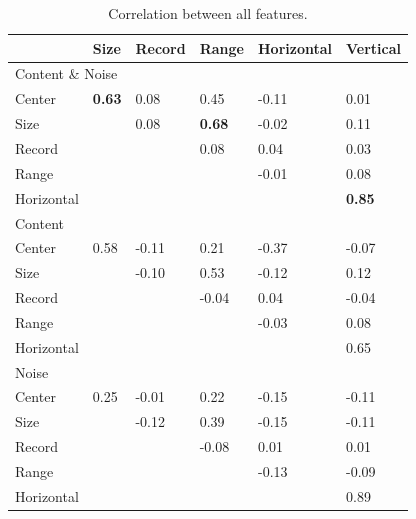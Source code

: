 \begin{table}[h]
\centering
\caption{Correlation between all features.}
\label{tab:featcorr}
\begin{tabular}{ | l | l | l | l | l | l |}
\hline
& Size & Record & Range & Horizontal & Vertical \\ \hline
\multicolumn{6}{|l|}{Content \& Noise} \\
\hline
Center & \textbf{0.63} & 0.08 & 0.45 & -0.11 & 0.01 \\
Size & & 0.08 & \textbf{0.68} & -0.02 & 0.11 \\
Record & & & 0.08 & 0.04 & 0.03 \\
Range & & & & -0.01 & 0.08 \\
Horizontal & & & & & \textbf{0.85} \\
\hline
\multicolumn{6}{|l|}{Content} \\
\hline
Center & 0.58 & -0.11 & 0.21 & -0.37 & -0.07 \\
Size & & -0.10 & 0.53 & -0.12 & 0.12 \\
Record & & & -0.04 & 0.04 & -0.04 \\
Range & & & & -0.03 & 0.08 \\
Horizontal & & & & & 0.65 \\
\hline
\multicolumn{6}{|l|}{Noise} \\
\hline
Center & 0.25 & -0.01 & 0.22 & -0.15 & -0.11 \\
Size & & -0.12 & 0.39 & -0.15 & -0.11 \\
Record & & & -0.08 & 0.01 & 0.01 \\
Range & & & & -0.13 & -0.09 \\
Horizontal & & & & & 0.89 \\
\hline
\end{tabular}
\end{table}

